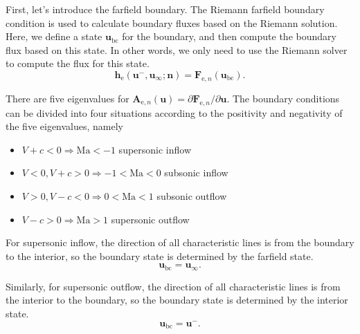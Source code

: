 \documentclass{develop-note}
\begin{document}
First, let's introduce the farfield boundary. The Riemann farfield boundary condition is used to calculate boundary fluxes based on the Riemann solution. Here, we define a state $\mathbf{u}_{\mathrm{bc}}$ for the boundary, and then compute the boundary flux based on this state. In other words, we only need to use the Riemann solver to compute the flux for this state.
\begin{equation}
  \mathbf{h}_{\mathrm{e}}(\mathbf{u}^{-},\mathbf{u}_{\infty};\mathbf{n})=\mathbf{F}_{\mathrm{e},n}(\mathbf{u}_{\mathrm{bc}}).
\end{equation}

There are five eigenvalues for $\mathbf{A}_{\mathrm{e},n}(\mathbf{u})=\partial\mathbf{F}_{\mathrm{e},n}/\partial\mathbf{u}$. The boundary conditions can be divided into four situations according to the positivity and negativity of the five eigenvalues, namely
\begin{itemize}
  \item $V+c<0\Rightarrow \mathrm{Ma}<-1$ supersonic inflow
  \item $V<0,V+c>0\Rightarrow -1<\mathrm{Ma}<0$ subsonic inflow
  \item $V>0,V-c<0\Rightarrow 0<\mathrm{Ma}<1$ subsonic outflow
  \item $V-c>0\Rightarrow \mathrm{Ma}>1$ supersonic outflow
\end{itemize}

For supersonic inflow, the direction of all characteristic lines is from the boundary to the interior, so the boundary state is determined by the farfield state.
\begin{equation}
  \mathbf{u}_{\mathrm{bc}}=\mathbf{u}_{\infty}.
\end{equation}

Similarly, for supersonic outflow, the direction of all characteristic lines is from the interior to the boundary, so the boundary state is determined by the interior state.
\begin{equation}
  \mathbf{u}_{\mathrm{bc}}=\mathbf{u}^{-}.
\end{equation}
\end{document}
